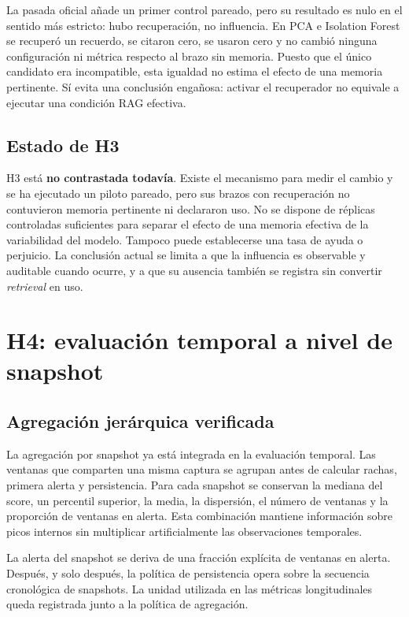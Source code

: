 La pasada oficial añade un primer control pareado, pero su resultado es nulo en
el sentido más estricto: hubo recuperación, no influencia. En PCA e Isolation
Forest se recuperó un recuerdo, se citaron cero, se usaron cero y no cambió
ninguna configuración ni métrica respecto al brazo sin memoria. Puesto que el
único candidato era incompatible, esta igualdad no estima el efecto de una
memoria pertinente. Sí evita una conclusión engañosa: activar el recuperador no
equivale a ejecutar una condición RAG efectiva.

\subsection{Estado de H3}

H3 está \textbf{no contrastada todavía}. Existe el mecanismo para medir el
cambio y se ha ejecutado un piloto pareado, pero sus brazos con recuperación no
contuvieron memoria pertinente ni declararon uso. No se dispone de réplicas
controladas suficientes para separar el efecto de una memoria efectiva de la
variabilidad del modelo. Tampoco puede establecerse una tasa de ayuda o
perjuicio. La conclusión actual se limita a que la influencia es observable y
auditable cuando ocurre, y a que su ausencia también se registra sin convertir
\emph{retrieval} en uso.

\section{H4: evaluación temporal a nivel de snapshot}

\subsection{Agregación jerárquica verificada}

La agregación por snapshot ya está integrada en la evaluación temporal. Las
ventanas que comparten una misma captura se agrupan antes de calcular rachas,
primera alerta y persistencia. Para cada snapshot se conservan la mediana del score, un
percentil superior, la media, la dispersión, el número de ventanas y la
proporción de ventanas en alerta. Esta combinación mantiene información sobre
picos internos sin multiplicar artificialmente las observaciones temporales.

La alerta del snapshot se deriva de una fracción explícita de ventanas en
alerta. Después, y solo después, la política de persistencia opera sobre la
secuencia cronológica de snapshots. La unidad utilizada en las métricas
longitudinales queda registrada junto a la política de agregación.

